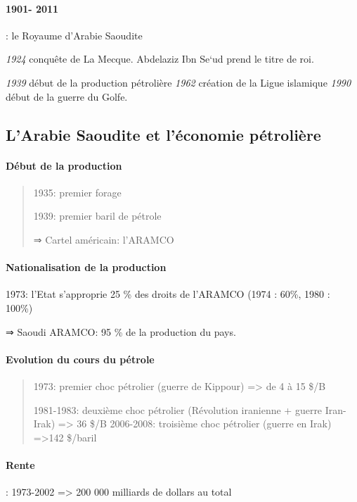   {\paragraph{1901- 2011} : le Royaume d'Arabie Saoudite}
 
 
\emph{1924} conquête de La Mecque. Abdelaziz Ibn Se`ud prend le titre de
roi.

\emph{1939} début de la production pétrolière \emph{1962} création de la
Ligue islamique \emph{1990} début de la guerre du Golfe.
 

 
\subsection{L'Arabie Saoudite et l'économie
pétrolière} 
 
\paragraph{ {Début de la
production}} 

\begin{quote}
1935: premier forage

1939: premier baril de pétrole

⇒ Cartel américain: l'ARAMCO
\end{quote}

 
\paragraph{{Nationalisation de la
production}}


1973: l'Etat s'approprie 25 \% des droits de l'ARAMCO (1974 : 60\%, 1980 : 100\%)


⇒ Saoudi ARAMCO: 95 \% de la production du pays.

 
\paragraph{Evolution du cours du
pétrole} 

\begin{quote}
1973: premier choc pétrolier (guerre de Kippour) =\textgreater{} de 4 à
15 \$/B

1981-1983: deuxième choc pétrolier (Révolution iranienne + guerre
Iran-Irak) =\textgreater{} 36 \$/B 2006-2008: troisième choc pétrolier
(guerre en Irak) =\textgreater142 \$/baril
\end{quote}

\paragraph{{Rente}}: 1973-2002 =\textgreater{} 200 000 milliards
de dollars au total


